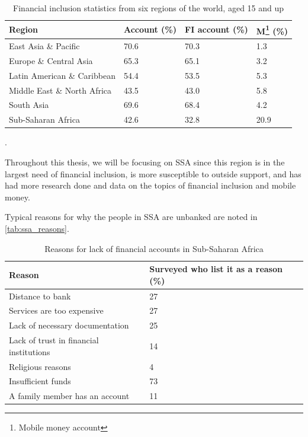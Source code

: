 \documentclass[11pt, a4paper]{article}
\begin{document}
\begin{table}[!ht]
\begin{tabular}{|l|l|l|l|}
\hline
\textbf{Region}             & \textbf{Account (\%)} & \textbf{FI account (\%)} & \textbf{M\footnote{Mobile money account} (\%)} \\ \hline
East Asia \& Pacific        & 70.6                  & 70.3                     & 1.3                                \\ \hline
Europe \& Central Asia      & 65.3                  & 65.1                     & 3.2                                \\ \hline
Latin American \& Caribbean & 54.4                  & 53.5                     & 5.3                                \\ \hline
Middle East \& North Africa & 43.5                  & 43.0                     & 5.8                                \\ \hline
South Asia                  & 69.6                  & 68.4                     & 4.2                                \\ \hline
Sub-Saharan Africa          & 42.6                  & 32.8                     & 20.9                               \\ \hline
\end{tabular}
\caption{Financial inclusion statistics from six regions of the world, aged 15 and up\cite{littledata}}.
\label{tab:financial_statistics}
\end{table}

Throughout this thesis, we will be focusing on SSA since this region is in the largest need of financial inclusion, is more susceptible to outside support, and has had more research done and data on the topics of financial inclusion and mobile money.

Typical reasons for why the people in SSA are unbanked are noted in \autoref{tab:ssa_reasons}.
\begin{table}[!ht]
\begin{tabular}{|l|l|}
\hline
\textbf{Reason} & \textbf{Surveyed who list it as a reason (\%)}\\ \hline
Distance to bank & 27 \\ \hline
Services are too expensive & 27 \\ \hline
Lack of necessary documentation & 25\\ \hline
Lack of trust in financial institutions & 14 \\ \hline
Religious reasons & 4 \\ \hline
Insufficient funds & 73 \\ \hline
A family member has an account & 11 \\ \hline
\end{tabular}
\caption{Reasons for lack of financial accounts in Sub-Saharan Africa\cite{gfindex}}
\label{tab:ssa_reasons}
\end{table}
\end{document}
